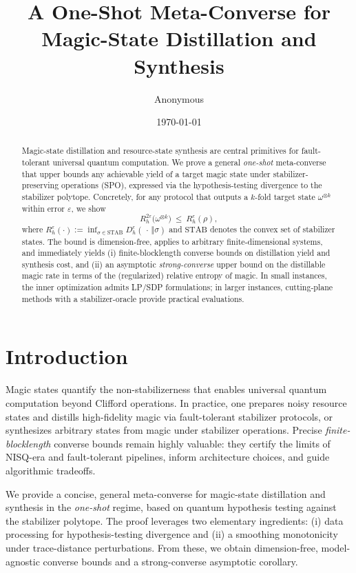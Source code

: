 \documentclass[11pt]{article}
\title{A One-Shot Meta-Converse for Magic-State Distillation and Synthesis}
\author{Anonymous}
\date{\today}
\theoremstyle{definition}
\newcommand{\Dh}[1]{D_h^{#1}}
\begin{document}
\maketitle

\begin{abstract}
Magic-state distillation and resource-state synthesis are central primitives for fault-tolerant universal quantum computation. We prove a general \emph{one-shot} meta-converse that upper bounds any achievable yield of a target magic state under stabilizer-preserving operations (SPO), expressed via the hypothesis-testing divergence to the stabilizer polytope. Concretely, for any protocol that outputs a $k$-fold target state $\omega^{\otimes k}$ within error $\varepsilon$, we show
\[
R_h^{2\varepsilon}\big(\omega^{\otimes k}\big)\ \le\ R_h^{\varepsilon}(\rho),
\]
where $R_h^{\varepsilon}(\cdot):=\inf_{\sigma\in\mathrm{STAB}} \Dh{\varepsilon}(\,\cdot\,\Vert\sigma)$ and $\mathrm{STAB}$ denotes the convex set of stabilizer states. The bound is dimension-free, applies to arbitrary finite-dimensional systems, and immediately yields (i) finite-blocklength converse bounds on distillation yield and synthesis cost, and (ii) an asymptotic \emph{strong-converse} upper bound on the distillable magic rate in terms of the (regularized) relative entropy of magic. In small instances, the inner optimization admits LP/SDP formulations; in larger instances, cutting-plane methods with a stabilizer-oracle provide practical evaluations.
\end{abstract}

\section{Introduction}
Magic states quantify the non-stabilizerness that enables universal quantum computation beyond Clifford operations. In practice, one prepares noisy resource states and distills high-fidelity magic via fault-tolerant stabilizer protocols, or synthesizes arbitrary states from magic under stabilizer operations. Precise \emph{finite-blocklength} converse bounds remain highly valuable: they certify the limits of NISQ-era and fault-tolerant pipelines, inform architecture choices, and guide algorithmic tradeoffs.
\medskip

We provide a concise, general meta-converse for magic-state distillation and synthesis in the \emph{one-shot} regime, based on quantum hypothesis testing against the stabilizer polytope. The proof leverages two elementary ingredients: (i) data processing for hypothesis-testing divergence and (ii) a smoothing monotonicity under trace-distance perturbations. From these, we obtain dimension-free, model-agnostic converse bounds and a strong-converse asymptotic corollary.
\end{document}
